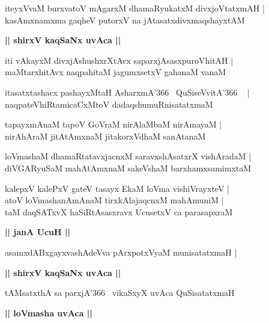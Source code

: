 \documentclass[twoside,12pt,openright]{book}
\newcounter{shloka}[chapter]
\def\uvaca#1{\centerline{{\large\textbf{#1}}}}
\begin{document}
\begin{shloka}%
iteyxVvaM burxvatoV mAgarxM dhamaRyukatxM divxjoVtatxmAH |\\
kasAmxnamxma gaqheV putorxV na jAtasatxdivxmaqshayxtAM
\end{shloka}

\uvaca{|| shirxV kaqSaNx uvAca ||}

\begin{shloka}%
iti vAkayxM divxjAshushxrXtAvx saparxjAsasxpuroVhitAH |\\
maMtarxhitAvx naqpahitaM jagumxsetxV gahanaM vanaM 
\end{shloka}

\begin{shloka}%
itasatxtashacx pashayxMtaH AsharxmA\char'366 ~QuSiseVvitA\char'366 ~ |\\
naqpateVhiRtamicaCxMtoV dadaqshumuRnisatatxmaM 
\end{shloka}

\begin{shloka}%
tapayxmAnaM tapoV GoVraM nirAlaMbaM nirAmayaM |\\
nirAhAraM jitAtAmxnaM jitakorxVdhaM sanAtanaM 
\end{shloka}

\begin{shloka}%
loVmashaM dhamaRtatavxjacnxM saravxshAsatxrX vishAradaM |\\
diVGARyuSaM  mahAtAmxnaM sakeVshaM barxhamxsamimxtaM
\end{shloka}

\begin{shloka}%
kalepxV kalePxV gateV tasayx EkaM loVma vishiVrayxteV |\\
atoV loVmashanAmAnaM tirxkAlajaqcnxM mahAmuniM |\\
taM daqSATxvX haSiRtAsasxravx UcusetxV ca parasapxraM
\end{shloka}

\uvaca{|| janA UcuH ||}

\begin{shloka}%
asamxdABxgayxvashAdeVva pArxpotxVyaM munisatatxmaH |\\
\end{shloka}

\uvaca{|| shirxV kaqSaNx uvAca ||}

\begin{shloka}%
tAMsatxthA sa parxjA\char'366 ~vikaSxyX uvAca QuSisatatxmaH 
\end{shloka}

\uvaca{|| loVmasha uvAca ||}
\end{document}
